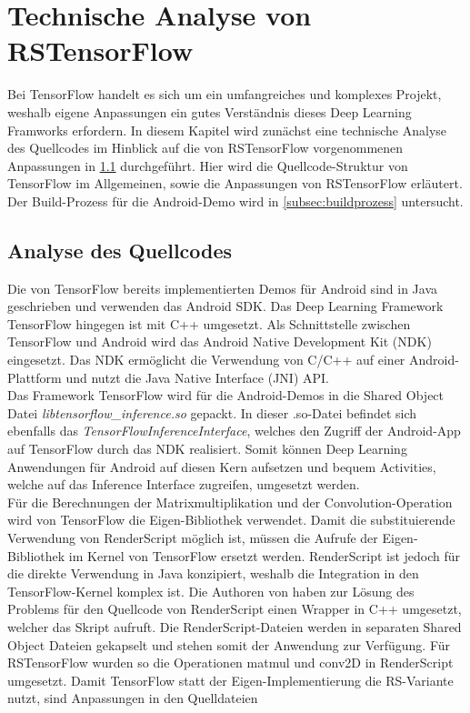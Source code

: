 \section{Technische Analyse von RSTensorFlow}
\label{sec:analyserstf}
Bei TensorFlow handelt es sich um ein umfangreiches und komplexes Projekt, weshalb eigene Anpassungen ein gutes Verständnis dieses Deep Learning Framworks erfordern. In diesem Kapitel wird zunächst eine technische Analyse des Quellcodes im Hinblick auf die von RSTensorFlow vorgenommenen Anpassungen in \ref{subsec:quellcodeanalyse} durchgeführt. Hier wird die Quellcode-Struktur von TensorFlow im Allgemeinen, sowie die Anpassungen von RSTensorFlow erläutert. Der Build-Prozess für die Android-Demo wird in \ref{subsec:buildprozess} untersucht. 

\subsection{Analyse des Quellcodes}
\label{subsec:quellcodeanalyse}
Die von TensorFlow bereits implementierten Demos für Android sind in Java geschrieben und verwenden das Android SDK. Das Deep Learning Framework TensorFlow hingegen ist mit C++ umgesetzt. Als Schnittstelle zwischen TensorFlow und Android wird das Android Native Development Kit (NDK) eingesetzt. Das NDK ermöglicht die Verwendung von C/C++ auf einer Android-Plattform und nutzt die Java Native Interface (JNI) API. \\
Das Framework TensorFlow wird für die Android-Demos in die Shared Object Datei \textit{libtensorflow\_inference.so} gepackt. In dieser .so-Datei befindet sich ebenfalls das \textit{TensorFlowInferenceInterface}, welches den Zugriff der Android-App auf TensorFlow durch das NDK realisiert. Somit können Deep Learning Anwendungen für Android auf diesen Kern aufsetzen und bequem Activities, welche auf das Inference Interface zugreifen, umgesetzt werden. 
\\
Für die Berechnungen der Matrixmultiplikation und der Convolution-Operation wird von TensorFlow die Eigen-Bibliothek \cite{todo-eigen} verwendet. Damit die substituierende Verwendung von RenderScript möglich ist, müssen die Aufrufe der Eigen-Bibliothek im Kernel von TensorFlow ersetzt werden. RenderScript ist jedoch für die direkte Verwendung in Java konzipiert, weshalb die Integration in den TensorFlow-Kernel komplex ist. Die Authoren von \cite{rstensorflow2017} haben zur Lösung des Problems für den Quellcode von RenderScript einen Wrapper in C++ umgesetzt, welcher das Skript aufruft. Die RenderScript-Dateien werden in separaten Shared Object Dateien gekapselt und stehen somit der Anwendung zur Verfügung. Für RSTensorFlow wurden so die Operationen matmul und conv2D in RenderScript umgesetzt. Damit TensorFlow statt der Eigen-Implementierung die RS-Variante nutzt, sind Anpassungen in den Quelldateien 
